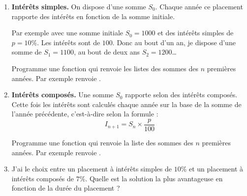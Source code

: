 \documentclass[11pt,class=report,crop=false]{standalone}
\begin{document}

\begin{activite}


\begin{enumerate}
  \item \textbf{Intérêts simples.} On dispose d'une somme $S_0$. Chaque année ce placement rapporte des intérêts en fonction de la somme initiale. 
 
  Par exemple avec une somme initiale $S_0 = 1000$ et des intérêts simples de $p = 10 \%$. Les intérêts sont de $100$. Donc au bout d'un an, je dispose d'une somme de $S_1=1100$, au bout de deux ans $S_2 = 1200$\ldots
  
  Programme une fonction  qui renvoie les listes des sommes des $n$ premières années. Par exemple  renvoie 
  \ci{[1000, 1100, 1200, 1300]}.
  
  
  
  \item \textbf{Intérêts composés.} Une somme $S_0$ rapporte selon des intérêts composés. Cette fois les intérêts sont calculés chaque année sur la base de la somme de l'année précédente, c'est-à-dire selon la formule : 
  $$I_{n+1} = S_n \times \frac {p}{100}$$
  
    Programme une fonction  qui renvoie la liste des sommes des $n$ premières années. Par exemple  renvoie 
  \ci{[1000, 1100, 1210, 1331]}.
  
  
  \item J'ai le choix entre un placement à intérêts simples de $10\%$ et un placement à intérêts composés de $7\%$.  Quelle est la solution la plus avantageuse en fonction de la durée du placement ? 
  
\end{enumerate}

\end{activite}

\end{document}
